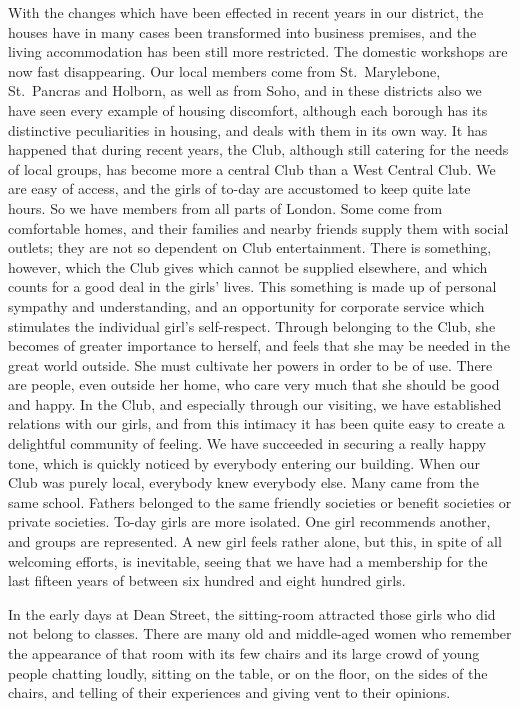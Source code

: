 With the changes which have been effected in recent
years in our district, the houses have in many cases been
transformed into business premises, and the living
accommodation has been still more restricted. The
domestic workshops are now fast disappearing. Our local
members come from St.\ Marylebone, St.\ Pancras and
Holborn, as well as from Soho, and in these districts also
we have seen every example of housing discomfort,
although each borough has its distinctive peculiarities in
housing, and deals with them in its own way. It has
happened that during recent years, the Club, although still
catering for the needs of local groups, has become more a
central Club than a West Central Club. We are easy of
access, and the girls of to-day are accustomed to keep
quite late hours. So we have members from all parts of
London. Some come from comfortable homes, and their
families and nearby friends supply them with social
outlets; they are not so dependent on Club entertainment.
There is something, however, which the Club gives which
cannot be supplied elsewhere, and which counts for a good
deal in the girls’ lives. This something is made up of
personal sympathy and understanding, and an opportunity
for corporate service which stimulates the individual
girl’s self-respect. Through belonging to the Club, she
becomes of greater importance to herself, and feels
that she may be needed in the great world outside.
She must cultivate her powers in order to be of use. There
are people, even outside her home, who care very much
that she should be good and happy. In the Club, and
especially through our visiting, we have established
relations with our girls, and from this intimacy it has been
quite easy to create a delightful community of feeling.
We have succeeded in securing a really happy tone, which
is quickly noticed by everybody entering our building.
When our Club was purely local, everybody knew everybody
else. Many came from the same school. Fathers
belonged to the same friendly societies or benefit societies
or private societies. To-day girls are more isolated. One
girl recommends another, and groups are represented.
A new girl feels rather alone, but this, in spite of all
welcoming efforts, is inevitable, seeing that we have had a
membership for the last fifteen years of between six
hundred and eight hundred girls.

In the early days at Dean Street, the sitting-room
attracted those girls who did not belong to classes. There
are many old and middle-aged women who remember
the appearance of that room with its few chairs and its
large crowd of young people chatting loudly, sitting on
the table, or on the floor, on the sides of the chairs, and
telling of their experiences and giving vent to their
opinions.

